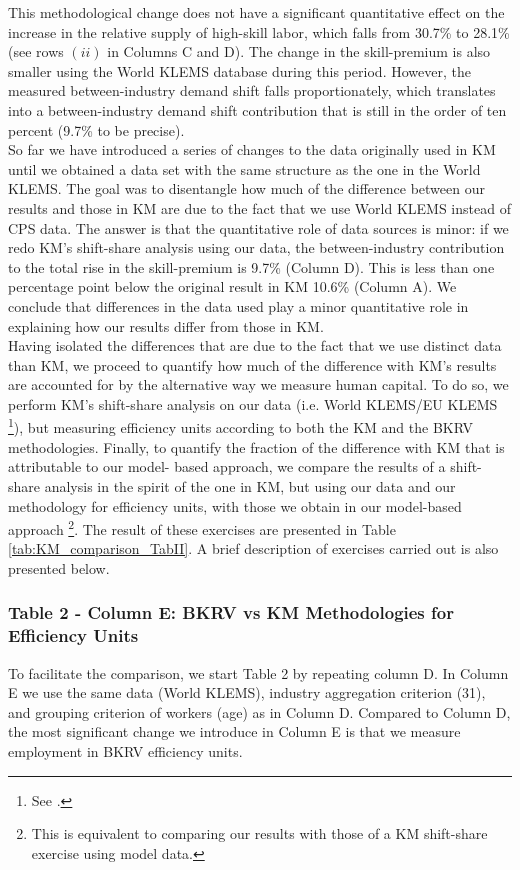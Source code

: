 \documentclass[10pt]{article}
\begin{document}
This methodological change does not have a significant quantitative effect on the increase in the relative supply of high-skill labor, which falls from 30.7\% to 28.1\% (see rows $(ii)$ in Columns C and D). The change in the skill-premium is also smaller using the World KLEMS database during this period. However, the measured between-industry demand shift falls proportionately, which translates into a between-industry demand shift contribution that is still in the order of ten percent (9.7\% to be precise).\\

So far we have introduced a series of changes to the data originally used in KM until we obtained a data set with the same structure as the one in the World KLEMS. The goal was to disentangle how much of the difference between our results and those in KM are due to the fact that we use World KLEMS instead of CPS data. The answer is that the quantitative role of data sources is minor: if we redo KM's shift-share analysis using our data, the between-industry contribution to the total rise in the skill-premium is 9.7\% (Column D). This is less than one percentage point below the original result in KM 10.6\% (Column A). We conclude that differences in the data used play a minor quantitative role in explaining how our results differ from those in KM.\\

Having isolated the differences that are due to the fact that we use distinct data than KM, we proceed to quantify how much of the difference with KM's results are accounted for by the alternative way we measure human capital. To do so, we perform KM's shift-share analysis on our data (i.e. World KLEMS/EU KLEMS \footnote{See \citet{OMaTim09}.}), but measuring efficiency units according to both the KM and the BKRV methodologies. Finally, to quantify the fraction of the difference with KM that is attributable to our model- based approach, we compare the results of a shift-share analysis in the spirit of the one in KM, but using our data and our methodology for efficiency units, with those we obtain in our model-based approach \footnote{This is equivalent to comparing our results with those of a KM shift-share exercise using model data.}. The result of these exercises are presented in Table \ref{tab:KM_comparison_TabII}. A brief description of exercises carried out is also presented below.\\

\subsubsection*{Table 2 - Column E: BKRV vs KM Methodologies for Efficiency Units}
To facilitate the comparison, we start Table 2 by repeating column D. In Column E we use the same data (World KLEMS), industry aggregation criterion (31), and grouping criterion of workers (age) as in Column D. Compared to Column D, the most significant change we introduce in Column E is that we measure employment in BKRV efficiency units.\\
\end{document}
